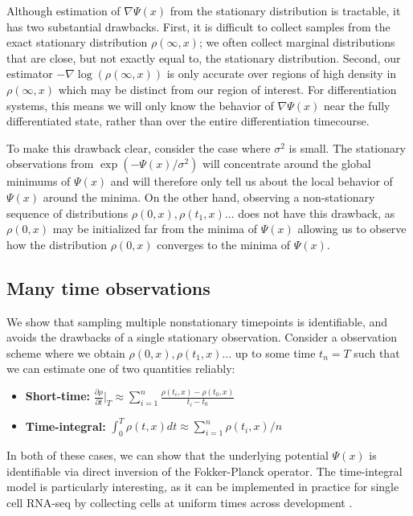 \documentclass{article}
\begin{document}
Although estimation of $\nabla \Psi(x)$ from the stationary distribution is tractable, it has two substantial drawbacks. First, it is difficult to collect samples from the exact stationary distribution $\rho(\infty,x)$; we often collect marginal distributions that are close, but not exactly equal to, the stationary distribution. Second, our estimator $-\nabla \log(\rho(\infty,x))$ is only accurate over regions of high density in $\rho(\infty,x)$ which may be distinct from our region of interest. For differentiation systems, this means we will only know the behavior of $\nabla \Psi(x)$ near the fully differentiated state, rather than over the entire differentiation timecourse.

To make this drawback clear, consider the case where $\sigma^2$ is small. The stationary observations from $\exp(-\Psi(x)/\sigma^2)$ will concentrate around the global minimums of $\Psi(x)$ and will therefore only tell us about the local behavior of $\Psi(x)$ around the minima. On the other hand, observing a non-stationary sequence of distributions $\rho(0,x), \rho(t_1,x) \hdots$ does not have this drawback, as $\rho(0,x)$ may be initialized far from the minima of $\Psi(x)$ allowing us to observe how the distribution $\rho(0,x)$ converges to the minima of $\Psi(x)$.

\subsection{Many time observations}\label{sec:manytime}

We show that sampling multiple nonstationary timepoints is identifiable, and avoids the drawbacks of a single stationary observation. Consider a observation scheme where we obtain $\rho(0,x), \rho(t_1,x) \hdots$ up to some time $t_n=T$ such that we can estimate one of two quantities reliably:
\begin{itemize}
\item \textbf{Short-time:} $\frac{\partial \rho}{\partial t}\bigg|_T \approx \sum_{i=1}^n\frac{\rho(t_{i},x)-\rho(t_0,x)}{t_{i}-t_{0}}$
\item \textbf{Time-integral:} $\int_0^T \rho(t,x)dt \approx \sum_{i=1}^n \rho(t_i,x)/n$
\end{itemize}

In both of these cases, we can show that the underlying potential $\Psi(x)$ is identifiable via direct inversion of the Fokker-Planck operator. The time-integral model is particularly interesting, as it can be implemented in practice for single cell RNA-seq by collecting cells at uniform times across development \citep{klein2015droplet}.
\end{document}
